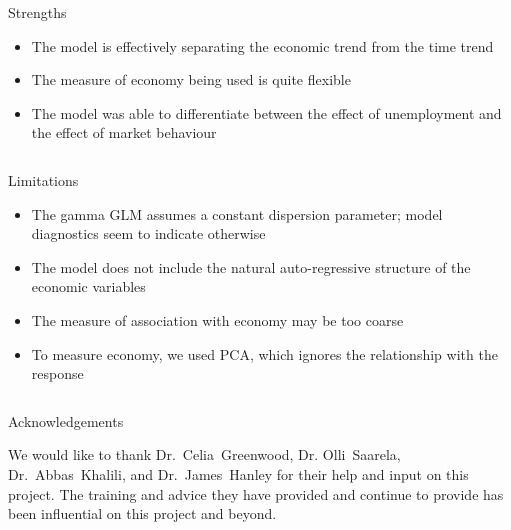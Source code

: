 \documentclass[final]{beamer}
\newcounter{acolumn}%
\def\autoheight{\vspace*{0pt}}%
\begin{document}
\begin{frame}
\begin{acolumns}[t]
\begin{column}{.24\linewidth}
        \end{column}
        
        \begin{column}{.24\linewidth}
		
         
         \begin{block}{Strengths}
         	\begin{itemize}
         		\item The model is effectively separating the economic trend from the time trend
         		\item The measure of economy being used is quite flexible
         		\item The model was able to differentiate between the effect of unemployment and the effect of market behaviour
         	\end{itemize}
          \autoheight   
         \end{block}
                      
        \end{column}
                  
        
        \begin{column}{.24\linewidth}
         
         \begin{block}{Limitations}
         	\begin{itemize}
         		\item The gamma GLM assumes a constant dispersion parameter; model diagnostics seem to indicate otherwise
         		\item The model does not include the natural auto-regressive structure of the economic variables
         		\item The measure of association with economy may be too coarse
         		\item To measure economy, we used PCA, which ignores the relationship with the response
         	\end{itemize}
          \autoheight   
         \end{block}
                      
        \end{column}
        
        
         \begin{column}{.24\linewidth}
                 
          \begin{block}{Acknowledgements}
             \begin{center}
             We would like to thank Dr.~Celia~Greenwood, Dr. Olli~Saarela, Dr.~Abbas~Khalili, and Dr.~James~Hanley for their help and input on this project. The training and advice they have provided and continue to provide has been influential on this project and beyond.
             \end{center}
             

\end{block}
\end{column}
\end{acolumns}
\end{frame}
\end{document}

